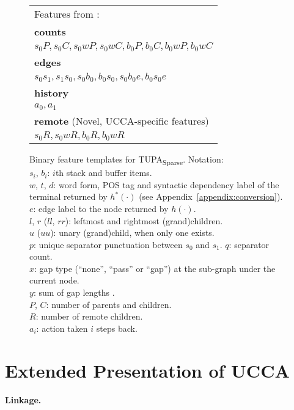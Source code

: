\documentclass[11pt,a4paper]{article}
\newcommand{\parser}[1]{TUPA\textsubscript{#1}}
\begin{document}
\begin{figure*}
\begin{adjustbox}{margin=3pt,frame}
\begin{tabular}{l}
{\footnotesize Features from \cite{tokgoz2015transition}:} \\
\textbf{counts} \\
$s_0P, s_0C, s_0wP, s_0wC, b_0P, b_0C, b_0wP, b_0wC$ \\
\textbf{edges} \\
$s_0s_1, s_1s_0, s_0b_0, b_0s_0, s_0b_0e, b_0s_0e$ \\
\textbf{history} \\
$a_0, a_1$ \\

\textbf{remote} \footnotesize (Novel, UCCA-specific features) \\
$s_0R, s_0wR, b_0R, b_0wR$
\end{tabular}
\end{adjustbox}
\captionsetup{singlelinecheck=off}
\caption[]{\label{fig:features}
  Binary feature templates for \parser{Sparse}. Notation:\\
  $s_i$, $b_i$: $i$th stack and buffer items.\\
  $w$, $t$, $d$: word form, POS tag and syntactic dependency label of the terminal returned by $h^*(\cdot)$
  (see Appendix~\ref{appendix:conversion}).\\
  $e$: edge label to the node returned by $h(\cdot)$.\\
  $l$, $r$ ($ll$, $rr$): leftmost and rightmost (grand)children.\\
  $u$ ($uu$): unary (grand)child, when only one exists.\\
  $p$: unique separator punctuation between $s_0$ and $s_1$. $q$: separator count.\\
  $x$: gap type (``none'', ``pass'' or ``gap'') at the sub-graph under the current node.\\
  $y$: sum of gap lengths \protect\cite{Maier:Lichte:11}.\\
  $P$, $C$: number of parents and children.\\
  $R$: number of remote children.\\
  $a_i$: action taken $i$ steps back.
}
\end{figure*}

\section{Extended Presentation of UCCA}
\label{appendix:extended_ucca}

\paragraph{Linkage.}
\end{document}
